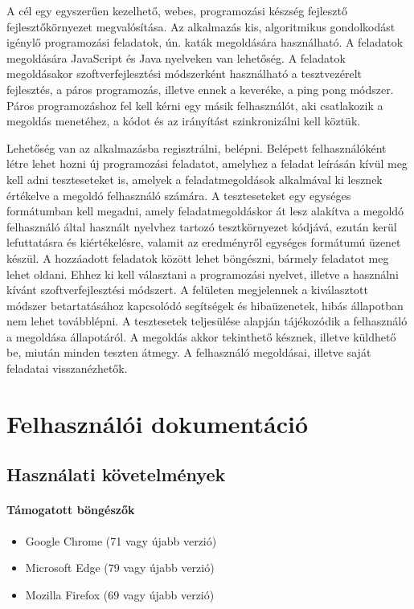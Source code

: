 \documentclass{elteikthesis}
\begin{document}
			A cél egy egyszerűen kezelhető, webes, programozási készség fejlesztő fejlesztőkörnyezet megvalósítása. Az alkalmazás kis, algoritmikus gondolkodást igénylő programozási feladatok, ún. katák megoldására használható. A feladatok megoldására JavaScript és Java nyelveken van lehetőség. A feladatok megoldásakor szoftverfejlesztési módszerként használható a tesztvezérelt fejlesztés, a páros programozás, illetve ennek a keveréke, a ping pong módszer. Páros programozáshoz fel kell kérni egy másik felhasználót, aki csatlakozik a megoldás menetéhez, a kódot és az irányítást szinkronizálni kell köztük.
		
			Lehetőség van az alkalmazásba regisztrálni, belépni. Belépett felhasználóként létre lehet hozni új programozási feladatot, amelyhez a feladat leírásán kívül meg kell adni teszteseteket is, amelyek a feladatmegoldások alkalmával ki lesznek értékelve a megoldó felhasználó számára. A teszteseteket egy egységes formátumban kell megadni, amely feladatmegoldáskor át lesz alakítva a megoldó felhasználó által használt nyelvhez tartozó tesztkörnyezet kódjává, ezután kerül lefuttatásra és kiértékelésre, valamit az eredményről egységes formátumú üzenet készül. A hozzáadott feladatok között lehet böngészni, bármely feladatot meg lehet oldani. Ehhez ki kell választani a programozási nyelvet, illetve a használni kívánt szoftverfejlesztési módszert. A felületen megjelennek a kiválasztott módszer betartatásához kapcsolódó segítségek és hibaüzenetek, hibás állapotban nem lehet továbblépni. A tesztesetek teljesülése alapján tájékozódik a felhasználó a megoldása állapotáról. A megoldás akkor tekinthető késznek, illetve küldhető be, miután minden teszten átmegy. A felhasználó megoldásai, illetve saját feladatai visszanézhetők.

	\chapter{Felhasználói dokumentáció}
		
		\section{Használati követelmények}
			\subsubsection{Támogatott böngészők}
				\begin{itemize}
					\setlength\itemsep{-0.5em}
					\item Google Chrome (71 vagy újabb verzió)
					\item Microsoft Edge (79 vagy újabb verzió)
					\item Mozilla Firefox (69 vagy újabb verzió)
				\end{itemize}
\end{document}
